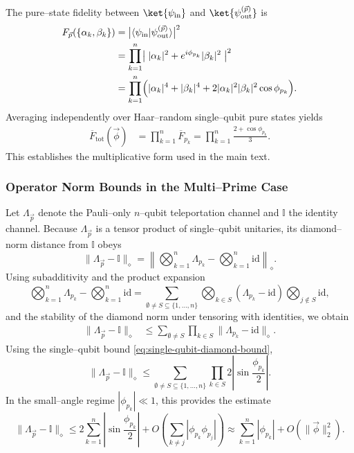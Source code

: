 \documentclass[11pt]{article}
\begin{document}
The pure–state fidelity between $\ket{\psi_{\mathrm{in}}}$ and $\ket{\psi_{\mathrm{out}}^{(\vec p)}}$ is
\begin{align*}
  F_{\vec p}(\{\alpha_k,\beta_k\})
  &= \bigl|\langle\psi_{\mathrm{in}}|\psi_{\mathrm{out}}^{(\vec p)}\rangle\bigr|^2 \\
  &= \prod_{k=1}^n
     \bigl|\;|\alpha_k|^2 + e^{i\phi_{p_k}}|\beta_k|^2\;\bigr|^2 \\
  &= \prod_{k=1}^n
     \Bigl(|\alpha_k|^4 + |\beta_k|^4
           + 2|\alpha_k|^2|\beta_k|^2\cos\phi_{p_k}\Bigr).
\end{align*}
Averaging independently over Haar–random single–qubit pure states yields
\begin{align*}
  \overline{F}_{\mathrm{tot}}(\vec\phi)
  &= \prod_{k=1}^n \overline{F}_{p_k}
   = \prod_{k=1}^n \frac{2+\cos\phi_{p_k}}{3}.
\end{align*}
This establishes the multiplicative form used in the main text.

\subsubsection{Operator Norm Bounds in the Multi–Prime Case}

Let $\Lambda_{\vec p}$ denote the Pauli–only $n$–qubit teleportation channel and $\mathbb{I}$ the identity channel. Because $\Lambda_{\vec p}$ is a tensor product of single–qubit unitaries, its diamond–norm distance from $\mathbb{I}$ obeys
\[
  \|\Lambda_{\vec p}-\mathbb{I}\|_\diamond
  = \left\|\bigotimes_{k=1}^n \Lambda_{p_k} - \bigotimes_{k=1}^n \mathrm{id}\right\|_\diamond.
\]
Using subadditivity and the product expansion
\[
  \bigotimes_{k=1}^n \Lambda_{p_k} - \bigotimes_{k=1}^n \mathrm{id}
  = \sum_{\emptyset\neq S\subseteq\{1,\dots,n\}}
      \bigotimes_{k\in S}(\Lambda_{p_k}-\mathrm{id})
      \bigotimes_{j\notin S} \mathrm{id},
\]
and the stability of the diamond norm under tensoring with identities, we obtain
\begin{align*}
  \|\Lambda_{\vec p}-\mathbb{I}\|_\diamond
  &\le \sum_{\emptyset\neq S}
        \prod_{k\in S} \|\Lambda_{p_k}-\mathrm{id}\|_\diamond.
\end{align*}
Using the single–qubit bound \eqref{eq:single-qubit-diamond-bound},
\begin{equation}
  \label{eq:n-qubit-diamond-bound}
  \|\Lambda_{\vec p}-\mathbb{I}\|_\diamond
  \le \sum_{\emptyset\neq S\subseteq\{1,\dots,n\}}
       \prod_{k\in S} 2\left|\sin\frac{\phi_{p_k}}{2}\right|.
\end{equation}
In the small–angle regime $|\phi_{p_k}|\ll 1$, this provides the estimate
\[
  \|\Lambda_{\vec p}-\mathbb{I}\|_\diamond
  \le 2\sum_{k=1}^n \left|\sin\frac{\phi_{p_k}}{2}\right|
    + O\!\left(\sum_{k\neq j}|\phi_{p_k}\phi_{p_j}|\right)
  \approx \sum_{k=1}^n |\phi_{p_k}| + O(\|\vec\phi\|_2^2).
\]
\end{document}
